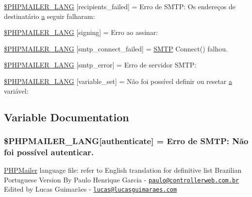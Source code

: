 \begin{DoxyCompactItemize}
\hyperlink{phpmailer_8lang-br_8php_a7589d30bb9b368327c2df015f3e6bcba}{\$\+P\+H\+P\+M\+A\+I\+L\+E\+R\+\_\+\+L\+A\+NG} \mbox{[}\textquotesingle{}recipients\+\_\+failed\textquotesingle{}\mbox{]} = \textquotesingle{}Erro de S\+M\+T\+P\+: Os endereços de destinatário \hyperlink{_chart_8min_8js_aef3b685c08bc6c76c8e729bd0e93901d}{a} seguir falharam\+: \textquotesingle{}
\item 
\hyperlink{phpmailer_8lang-br_8php_a68e437bdb9b968a5a67320f03d231565}{\$\+P\+H\+P\+M\+A\+I\+L\+E\+R\+\_\+\+L\+A\+NG} \mbox{[}\textquotesingle{}signing\textquotesingle{}\mbox{]} = \textquotesingle{}Erro ao assinar\+: \textquotesingle{}
\item 
\hyperlink{phpmailer_8lang-br_8php_a7b321d4ca1e9df702403ed4c61aa0980}{\$\+P\+H\+P\+M\+A\+I\+L\+E\+R\+\_\+\+L\+A\+NG} \mbox{[}\textquotesingle{}smtp\+\_\+connect\+\_\+failed\textquotesingle{}\mbox{]} = \textquotesingle{}\hyperlink{class_s_m_t_p}{S\+M\+TP} Connect() falhou.\textquotesingle{}
\item 
\hyperlink{phpmailer_8lang-br_8php_a7d9cffba1e669c845f8a4c891ee50064}{\$\+P\+H\+P\+M\+A\+I\+L\+E\+R\+\_\+\+L\+A\+NG} \mbox{[}\textquotesingle{}smtp\+\_\+error\textquotesingle{}\mbox{]} = \textquotesingle{}Erro de servidor S\+M\+T\+P\+: \textquotesingle{}
\item 
\hyperlink{phpmailer_8lang-br_8php_af795debc7a739d038742691c358d9032}{\$\+P\+H\+P\+M\+A\+I\+L\+E\+R\+\_\+\+L\+A\+NG} \mbox{[}\textquotesingle{}variable\+\_\+set\textquotesingle{}\mbox{]} = \textquotesingle{}Não foi possível definir ou resetar \hyperlink{_chart_8min_8js_aef3b685c08bc6c76c8e729bd0e93901d}{a} variável\+: \textquotesingle{}
\end{DoxyCompactItemize}


\subsection{Variable Documentation}
\subsubsection[{\texorpdfstring{\$\+P\+H\+P\+M\+A\+I\+L\+E\+R\+\_\+\+L\+A\+NG}{$PHPMAILER_LANG}}]{\setlength{\rightskip}{0pt plus 5cm}\$P\+H\+P\+M\+A\+I\+L\+E\+R\+\_\+\+L\+A\+NG\mbox{[}\textquotesingle{}authenticate\textquotesingle{}\mbox{]} = \textquotesingle{}Erro de S\+M\+T\+P\+: Não foi possível autenticar.\textquotesingle{}}\hypertarget{phpmailer_8lang-br_8php_a2cb33073c989b85580748e331ed8b4aa}{}\label{phpmailer_8lang-br_8php_a2cb33073c989b85580748e331ed8b4aa}
\hyperlink{class_p_h_p_mailer}{P\+H\+P\+Mailer} language file\+: refer to English translation for definitive list Brazilian Portuguese Version By Paulo Henrique Garcia -\/ \href{mailto:paulo@controllerweb.com.br}{\tt paulo@controllerweb.\+com.\+br} Edited by Lucas Guimarães -\/ \href{mailto:lucas@lucasguimaraes.com}{\tt lucas@lucasguimaraes.\+com} 

